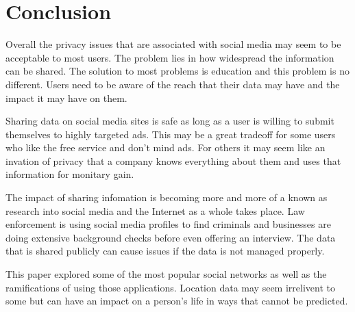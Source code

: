 \section{Conclusion}
Overall the privacy issues that are associated with social media may seem to be
acceptable to most users. The problem lies in how widespread the information can
be shared. The solution to most problems is education and this problem is no
different. Users need to be aware of the reach that their data may have and the
impact it may have on them.

Sharing data on social media sites is safe as long as a user is willing to
submit themselves to highly targeted ads. This may be a great tradeoff for some
users who like the free service and don't mind ads. For others it may seem like
an invation of privacy that a company knows everything about them and uses that
information for monitary gain.

The impact of sharing infomation is becoming more and more of a known as research
into social media and the Internet as a whole takes place. Law enforcement is
using social media profiles to find criminals and businesses are doing extensive
background checks before even offering an interview. The data that is shared
publicly can cause issues if the data is not managed properly.

This paper explored some of the most popular social networks as well as the
ramifications of using those applications. Location data may seem irrelivent to
some but can have an impact on a person's life in ways that cannot be predicted.

